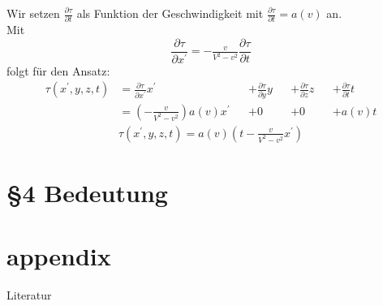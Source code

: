 \documentclass[]{beamer}%
\begin{document}
\begin{frame}
    Wir setzen 
        $\frac{\partial \tau}{\partial t}$
    als Funktion der Geschwindigkeit mit 
        $\frac{\partial \tau}{\partial t} = a(v)$
    an.\\\vspace{20pt}
    Mit
    \begin{equation*}
        \boxed{
            \frac{\partial \tau}{\partial x^\prime} 
        }
        =
        -\tfrac{v}{V^2-v^2}
        \boxed{
            \frac{\partial \tau}{\partial t} 
        }
    \end{equation*}
    folgt für den Ansatz:
    \begin{align*}
        \tau    \left( x^\prime, y, z, t\right)
        &=
        \frac{\partial \tau}{\partial x^\prime} x^\prime
        &&+
        \frac{\partial \tau}{\partial y} y
        &&+
        \frac{\partial \tau}{\partial z} z
        &&+
        \frac{\partial \tau}{\partial t} t\\
        &=
        \left( 
            -\tfrac{v}{V^2-v^2}
        \right) a\left( v \right) x^\prime
        &&+
        0 
        &&+
        0 
        &&+
        a\left( v \right) t 
    \end{align*}
    \begin{align*}
        \tau    \left( x^\prime, y, z, t\right)
        =
        a\left( v \right) 
        \left( 
            t-\tfrac{v}{V^2-v^2} x^\prime
        \right)
    \end{align*}
\end{frame}

\section{§4 Bedeutung}
\begin{frame}
\end{frame}

\appendix
\section{appendix}
\begin{frame}
\end{frame}

\begin{frame}{Literatur}
    
    
\end{frame}
\end{document}
